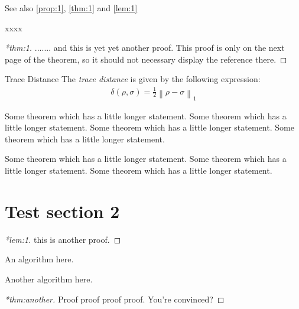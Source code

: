 \documentclass[12pt]{article}
\begin{document}
See also \autoref{prop:1}, \autoref{thm:1} and \autoref{lem:1}

\cleardoublepage
xxxx
\begin{proof}[*thm:1]
  ....... and this is yet yet another proof.  This proof is only on the next page of the
  theorem, so it should not necessary display the reference there.
\end{proof}

\begin{thmheading}{Trace Distance}
  \label{thmheading:trace-dist}
  The \emph{trace distance} is given by the following expression:
  \begin{align}
    \delta(\rho,\sigma) = \frac12 \left\lVert \rho - \sigma \right\rVert_1
  \end{align}
\end{thmheading}

\begin{theorem}
  \label{thm:long}
  Some theorem which has a little longer statement.
  Some theorem which has a little longer statement.
  Some theorem which has a little longer statement.
  Some theorem which has a little longer statement.

  Some theorem which has a little longer statement.
  Some theorem which has a little longer statement.
  Some theorem which has a little longer statement.
\end{theorem}

\cleardoublepage

\section{Test section 2}

\begin{proof}[*lem:1]
  this is another proof.
\end{proof}

\begin{algorithm}
  \label{algo:1}
  An algorithm here.
\end{algorithm}

\begin{algorithm}
  \label{algo:2}
  Another algorithm here.
\end{algorithm}

\cleardoublepage

\begin{proof}[*thm:another]
  Proof proof proof proof. You're convinced?
\end{proof}
\end{document}
